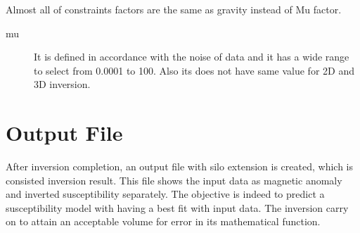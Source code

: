 Almost all of constraints factors are the same as gravity instead of Mu factor.\\

\begin{description} 	

\item[mu]
It is defined in accordance with the noise of data and it has a wide range to select from 0.0001 to 100. Also its does not have same value for 2D and 3D inversion.

\end{description}

\section{Output File}

After inversion completion, an output file with silo extension is created, which is consisted inversion result. This file shows the input data as magnetic anomaly and inverted susceptibility separately. The objective is indeed to  predict a susceptibility model with having a best fit with input data. The inversion carry on to attain an acceptable volume for error in its mathematical function. 


